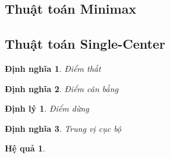 \documentclass[12pt,a4paper]{report}
\newtheorem{dn}{Định nghĩa}
\newtheorem{dl}{Định lý}
\newtheorem{hq}{Hệ quả}
\begin{document}
\subsection{Thuật toán Minimax}

\subsection{Thuật toán Single-Center}

\begin{dn}{Điểm thắt}
\end{dn}

\begin{dn}{Điểm cân bằng}
\end{dn}

\begin{dl}{Điểm dừng}
\end{dl}

\begin{dn}{Trung vị cục bộ}
\end{dn}

\begin{hq}
\end{hq}


\end{document}
